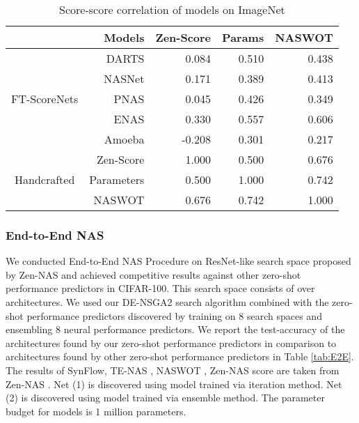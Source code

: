 \documentclass[lettersize,journal]{IEEEtran}
\begin{document}
            \begin{table}
                \caption{Score-score correlation of models on ImageNet}
                \label{tab:score_accuracy_correlation_imagenet}
                \centering
                \begin{tabular}{c|r|rrr}
                \toprule
                    & Models & Zen-Score & Params & NASWOT\\
                    \midrule
                     \multirow{5}{*}{FT-ScoreNets} &DARTS & 0.084 & 0.510 & 0.438 \\
                    &NASNet & 0.171 & 0.389 & 0.413 \\
                    &PNAS & 0.045 & 0.426 & 0.349 \\
                    &ENAS & 0.330 & 0.557 & 0.606 \\
                    &Amoeba & -0.208 & 0.301 & 0.217 \\

                    \midrule
                    \multirow{3}{*}{Handcrafted}&Zen-Score \cite{Zen-NAS} & 1.000 & 0.500 & 0.676 \\
                    &Parameters & 0.500 & 1.000 & 0.742 \\
                    &NASWOT \cite{naswot} & 0.676 & 0.742 & 1.000 \\
                \bottomrule
              \end{tabular}
            \end{table}

        \subsubsection{End-to-End NAS} \label{sec:E2ENAS}
            We conducted End-to-End NAS Procedure on ResNet-like search space proposed by Zen-NAS and achieved competitive results against other zero-shot performance predictors in CIFAR-100. This search space consists of over  architectures. We used our DE-NSGA2 search algorithm combined with the zero-shot performance predictors discovered by training on 8 search spaces and ensembling 8 neural performance predictors. We report the test-accuracy of the architectures found by our zero-shot performance predictors in comparison to architectures found by other zero-shot performance predictors in Table \ref{tab:E2E}. The results of SynFlow, TE-NAS \cite{TE-NAS}, NASWOT \cite{naswot}, Zen-NAS score are taken from Zen-NAS \cite{Zen-NAS}. Net (1) is discovered using model trained via iteration method. Net (2) is discovered using model trained via ensemble method. The parameter budget for models is 1 million parameters.
\end{document}
